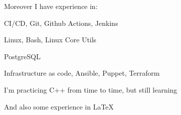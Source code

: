Moreover I have experience in:
\begin{bulist}
  \item CI/CD, Git, Github Actions, Jenkins
  \item Linux, Bash, Linux Core Utils
  \item PostgreSQL
  \item Infrastructure as code, Ansible, Puppet, Terraform
  \item I'm practicing C++ from time to time, but still learning
\end{bulist}
And also some experience in \LaTeX
